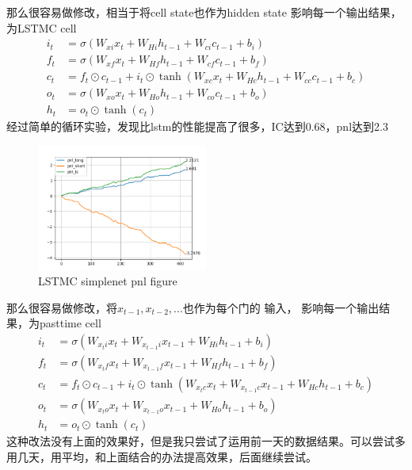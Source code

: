 \documentclass[11pt]{ctexart}
\begin{document}
那么很容易做修改，相当于将cell state也作为hidden state 影响每一个输出结果，为LSTMC cell
\begin{equation}
\begin{split}
    i_t &= \sigma (W_{x i} x_t + W_{H i} h_{t-1} + W_{c i} c_{t-1} + b_i)\\
    f_t &= \sigma (W_{x f} x_t + W_{H f} h_{t-1} + W_{c f} c_{t-1} +b_f)\\
    c_t &= f_t \odot c_{t-1} + i_t \odot \tanh (W_{x c} x_t + W_{H c} h_{t-1} + W_{c c} c_{t-1} +b_c)\\
    o_t &= \sigma (W_{x o} x_t + W_{H o} h_{t-1} + W_{c o} c_{t-1} +b_o)\\
    h_t &= o_t \odot \tanh(c_t)
\end{split}
\end{equation}
经过简单的循环实验，发现比lstm的性能提高了很多，IC达到0.68，pnl达到2.3
\begin{figure}[!ht]
\begin{center}
\includegraphics[width=0.5\textwidth]{ww.PNG}
\end{center}
\caption{LSTMC simplenet pnl figure}
\label{FIG.6}
\end{figure}

那么很容易做修改，将$x_{t-1}, x_{t-2},...$也作为每个门的 输入， 影响每一个输出结果，为pasttime cell
\begin{equation}
\begin{split}
    i_t &= \sigma (W_{x_t i} x_t + W_{x_{t-1} i} x_{t-1} +W_{H i} h_{t-1} + b_i)\\
    f_t &= \sigma (W_{x_t f} x_t + W_{x_{t-1} f} x_{t-1} +W_{H f} h_{t-1} + b_f)\\
    c_t &= f_t \odot c_{t-1} + i_t \odot \tanh (W_{x_t c} x_t + W_{x_{t-1} c} x_{t-1} +W_{H c} h_{t-1} + b_c)\\
    o_t &= \sigma (W_{x_t o} x_t + W_{x_{t-1} o} x_{t-1} +W_{H o} h_{t-1} + b_o)\\
    h_t &= o_t \odot \tanh(c_t)
\end{split}
\end{equation}
这种改法没有上面的效果好，但是我只尝试了运用前一天的数据结果。可以尝试多用几天，用平均，和上面结合的办法提高效果，后面继续尝试。
\end{document}
